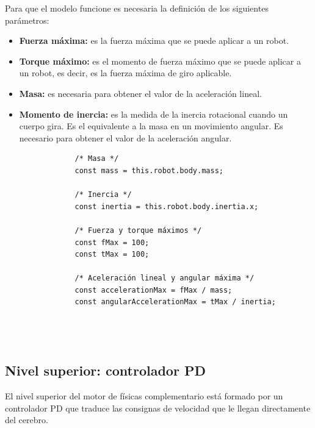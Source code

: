 Para que el modelo funcione es necesaria la definición de los siguientes parámetros:
\begin{itemize}
    \item \textbf{Fuerza máxima:} es la fuerza máxima que se puede aplicar a un robot.
    \item \textbf{Torque máximo:} es el momento de fuerza máximo que se puede aplicar a un robot, es decir, es la fuerza máxima de giro aplicable.
    \item \textbf{Masa:} es necesaria para obtener el valor de la aceleración lineal.
    \item \textbf{Momento de inercia:} es la medida de la inercia rotacional cuando un cuerpo gira. Es el equivalente a la masa en un movimiento angular. Es necesario para obtener el valor de la aceleración angular.
\end{itemize}

\small
\begin{verbatim}
                /* Masa */
                const mass = this.robot.body.mass;
                    
                /* Inercia */
                const inertia = this.robot.body.inertia.x;
                
                /* Fuerza y torque máximos */
                const fMax = 100;
                const tMax = 100;
                    
                /* Aceleración lineal y angular máxima */
                const accelerationMax = fMax / mass;
                const angularAccelerationMax = tMax / inertia;
                    
                    
                    
\end{verbatim}



\subsection{Nivel superior: controlador PD}
\normalsize
El nivel superior del motor de físicas complementario está formado por un controlador PD que traduce las consignas de velocidad que le llegan directamente del cerebro.\newline

